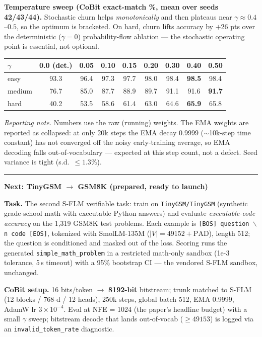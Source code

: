 \documentclass[10pt]{article}
\newcommand{\best}[1]{\textbf{\color{cobit}#1}}
\begin{document}
\textbf{Temperature sweep (CoBit exact-match \%, mean over seeds 42/43/44).} Stochastic churn helps
\emph{monotonically} and then plateaus near $\gamma\approx0.4$--$0.5$, so the optimum is bracketed. On hard,
churn lifts accuracy by $+26$ pts over the deterministic ($\gamma{=}0$) probability-flow ablation --- the
stochastic operating point is essential, not optional.

\begin{center}
\footnotesize
\begin{tabular}{l c c c c c c c c}
\toprule
$\gamma$ & 0.0 (det.) & 0.05 & 0.10 & 0.15 & 0.20 & 0.30 & 0.40 & 0.50 \\
\midrule
easy   & 93.3 & 96.4 & 97.3 & 97.7 & 98.0 & 98.4 & \best{98.5} & 98.4 \\
medium & 76.7 & 85.0 & 87.7 & 88.9 & 89.7 & 91.1 & 91.6 & \best{91.7} \\
hard   & 40.2 & 53.5 & 58.6 & 61.4 & 63.0 & 64.6 & \best{65.9} & 65.8 \\
\bottomrule
\end{tabular}
\end{center}

\vspace{-2pt}
{\footnotesize\emph{Reporting note.} Numbers use the raw (running) weights. The EMA weights are reported as
collapsed: at only 20k steps the EMA decay 0.9999 ($\sim$10k-step time constant) has not converged off the noisy
early-training average, so EMA decoding falls out-of-vocabulary --- expected at this step count, not a defect.
Seed variance is tight (s.d.\ $\le 1.3$\%).}

\vspace{2pt}
\hrule
\vspace{4pt}

{\large\bfseries Next: TinyGSM $\rightarrow$ GSM8K (prepared, ready to launch)}

\textbf{Task.} The second S-FLM verifiable task: train on \texttt{TinyGSM/TinyGSM} (synthetic grade-school math
with executable Python answers) and evaluate \emph{executable-code accuracy} on the 1{,}319 GSM8K test problems.
Each example is \texttt{[BOS] question $\backslash$n code [EOS]}, tokenized with SmolLM-135M ($|V|=49152{+}\textrm{PAD}$),
length 512; the question is conditioned and masked out of the loss. Scoring runs the generated
\texttt{simple\_math\_problem} in a restricted math-only sandbox (1e-3 tolerance, 5\,s timeout) with a 95\%
bootstrap CI --- the vendored S-FLM sandbox, unchanged.

\textbf{CoBit setup.} 16 bits/token $\rightarrow$ \textbf{8192-bit} bitstream; trunk matched to S-FLM
(12 blocks / 768-d / 12 heads), 250k steps, global batch 512, EMA 0.9999, AdamW lr $3\!\times\!10^{-4}$.
Eval at NFE = 1024 (the paper's headline budget) with a small $\gamma$ sweep; bitstream decode that lands
out-of-vocab ($\geq 49153$) is logged via an \texttt{invalid\_token\_rate} diagnostic.
\end{document}
